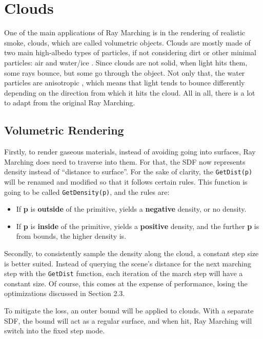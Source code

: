 \chapter{Clouds}\label{chp:LABEL_CHP_4}

One of the main applications of Ray Marching is in the rendering of realistic smoke, clouds, which are called volumetric objects. Clouds are mostly made of two main high-albedo types of particles, if not considering dirt or other minimal particles: air and water/ice \cite{:REF_IN_1}.
Since clouds are not solid, when light hits them, some rays bounce, but some go through the object. Not only that, the water particles are anisotropic \cite{:REF_IN_1}, which means that light tends to bounce differently depending on the direction from which it hits the cloud. All in all, there is a lot to adapt from the original Ray Marching. 

\section{Volumetric Rendering}

Firstly, to render gaseous materials, instead of avoiding going into surfaces, Ray Marching does need to traverse into them. For that, the SDF now represents density instead of ``distance to surface''. For the sake of clarity, the \texttt{GetDist(p)} will be renamed and modified so that it follows certain rules. This function is going to be called \texttt{GetDensity(p)}, and the rules are:

\begin{itemize}
    \item If \textbf{p} is \textbf{outside} of the primitive, yields a \textbf{negative} density, or no density.
    \item If \textbf{p} is \textbf{inside} of the primitive, yields a \textbf{positive} density, and the further \textbf{p} is from bounds, the higher density is.
\end{itemize}

Secondly, to consistently sample the density along the cloud, a constant step size is better suited. Instead of querying the scene's distance for the next marching step with the \texttt{GetDist} function, each iteration of the march step will have a constant size. Of course, this comes at the expense of performance, losing the optimizations discussed in Section 2.3.

To mitigate the loss, an outer bound will be applied to clouds. With a separate SDF, the bound will act as a regular surface, and when hit, Ray Marching will switch into the fixed step mode.

